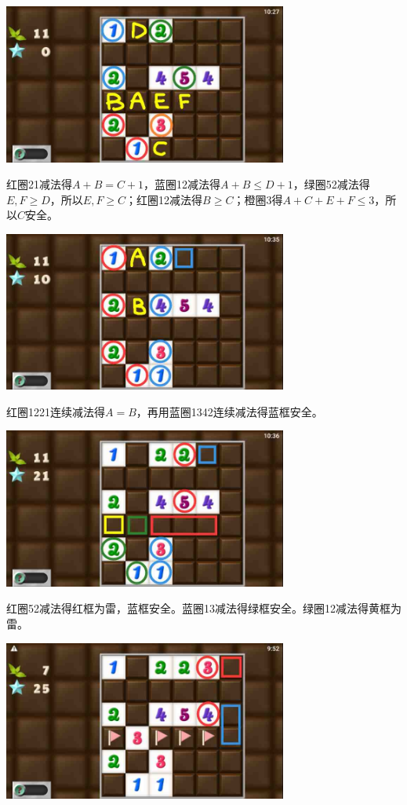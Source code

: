 \subsection{} %
\begin{center}
    \includegraphics[width=0.7\textwidth]{puzzlelow/236-1.jpg}
\end{center}
红圈21减法得$A+B=C+1$，蓝圈12减法得$A+B\le D+1$，绿圈52减法得$E,F\ge D$，所以$E,F\ge C$；红圈12减法得$B\ge C$；橙圈3得$A+C+E+F\le 3$，所以$C$安全。
\begin{center}
    \includegraphics[width=0.7\textwidth]{puzzlelow/236-2.jpg}
\end{center}
红圈1221连续减法得$A=B$，再用蓝圈1342连续减法得蓝框安全。
\begin{center}
    \includegraphics[width=0.7\textwidth]{puzzlelow/236-3.jpg}
\end{center}
红圈52减法得红框为雷，蓝框安全。蓝圈13减法得绿框安全。绿圈12减法得黄框为雷。
\begin{center}
    \includegraphics[width=0.7\textwidth]{puzzlelow/236-4.jpg}
\end{center}
